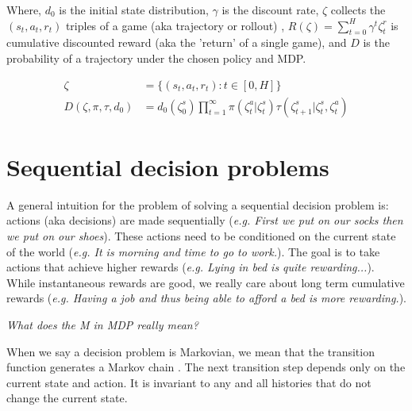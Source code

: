 Where, $d_0$ is the initial state distribution, $\gamma$ is the discount rate, $\zeta$ collects the $(s_t, a_t, r_t)$ triples of a game (aka trajectory or rollout) \footnotemark,
$R(\zeta) =\sum_{t=0}^H \gamma^t \zeta^r_t$ is cumulative discounted reward (aka the 'return' of a single game), and $D$ is the probability of a trajectory under the chosen policy and MDP.


\begin{align*}
\zeta &= \{(s_t, a_t, r_t) : t \in [0, H]\} \tag{trajectory} \\
D(\zeta, \pi, \tau, d_0) &= d_0(\zeta^s_0) \prod_{t=1}^{\infty} \pi(\zeta^a_t|\zeta^s_t) \tau(\zeta^s_{t+1}|\zeta^s_t, \zeta^a_t) \tag{p($\zeta$)}
\end{align*}


\section{Sequential decision problems}

A general intuition for the problem of solving a sequential decision problem is: actions (aka decisions) are made
sequentially (\textit{e.g. First we put on our socks then we put on our shoes}).
These actions need to be conditioned on the current state of the world (\textit{e.g. It is morning and time to go to work.}).
The goal is to take actions that achieve higher rewards (\textit{e.g. Lying in bed is quite rewarding...}). While instantaneous
rewards are good, we really care about long term cumulative rewards (\textit{e.g. Having a job and thus being able to afford a bed is more rewarding.}).


\begin{displayquote}
  \textsl{What does the M in MDP really mean?}
\end{displayquote}

When we say a decision problem is Markovian, we mean that the transition
function generates a Markov chain \cite{Markov2006}. The next transition step depends only
on the current state and action. It is invariant to any and all histories that do not
change the current state. \footnotemark

